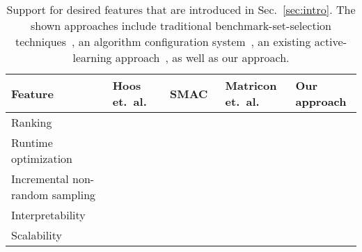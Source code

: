 \documentclass[runningheads]{llncs}
\newcommand{\cmark}{\ding{51}}
\newcommand{\xmark}{\ding{55}}
\begin{document}



\begin{table}[tbp]
  \centering
  \caption{Support for desired features that are introduced in Sec.~\ref{sec:intro}. The shown approaches include traditional benchmark-set-selection techniques~\cite{HoosKSS13}, an algorithm configuration system~\cite{HutterHL11}, an existing active-learning approach~\cite{MatriconAFSH21}, as well as our approach.}
  \label{tab:requirements}
  \vspace{0.2cm}
  \begin{tabular}{
    m{}
    >{\centering\arraybackslash}m{}
    >{\centering\arraybackslash}m{}
    >{\centering\arraybackslash}m{}
    >{\centering\arraybackslash}m{}
  }
    \hline
    Feature & Hoos \mbox{et. al.~\cite{HoosKSS13}} & SMAC~\cite{HutterHL11} & Matricon \mbox{et. al.~\cite{MatriconAFSH21}} & Our approach \\
    \hline
    Ranking & \cmark & \xmark & \cmark & \cmark \\
    Runtime optimization & \xmark & \cmark & \cmark & \cmark \\
    Incremental non-random sampling & \xmark & \xmark & \cmark & \cmark \\
    Interpretability & \cmark & \xmark & \xmark & \cmark \\
    Scalability & \cmark & \cmark & \xmark & \cmark \\
    \hline
  \end{tabular}
\end{table}
\end{document}
